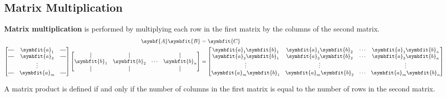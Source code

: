 \documentclass{article}
\begin{document}
\subsection{Matrix Multiplication}
\begin{definition}
    \textbf{Matrix multiplication} is performed by multiplying each row
    in the first matrix by the columns of the second matrix.
    \begin{align*}
        \symbf{A} \symbfit{B} & = \symbfit{C} \\
        \begin{bmatrix}
            \horzbar & \symbfit{a}_{1} & \horzbar \\
            \horzbar & \symbfit{a}_{2} & \horzbar \\
                     & \vdots          &          \\
            \horzbar & \symbfit{a}_{m} & \horzbar
        \end{bmatrix}
        \begin{bmatrix}
            \vertbar        & \vertbar        &        & \vertbar        \\
            \symbfit{b}_{1} & \symbfit{b}_{2} & \cdots & \symbfit{b}_{n} \\
            \vertbar        & \vertbar        &        & \vertbar
        \end{bmatrix}
                                & =
        \begin{bmatrix}
            \symbfit{a}_1\symbfit{b}_1 & \symbfit{a}_1\symbfit{b}_2 & \cdots & \symbfit{a}_1\symbfit{b}_n \\
            \symbfit{a}_2\symbfit{b}_1 & \symbfit{a}_2\symbfit{b}_2 & \cdots & \symbfit{a}_2\symbfit{b}_n \\
            \vdots                     & \vdots                     &        & \vdots                     \\
            \symbfit{a}_m\symbfit{b}_1 & \symbfit{a}_m\symbfit{b}_2 & \cdots & \symbfit{a}_m\symbfit{b}_n
        \end{bmatrix}
    \end{align*}
\end{definition}
\begin{theorem}
    A matrix product is defined if and only if the number of columns in
    the first matrix is equal to the number of rows in the second
    matrix.
\end{theorem}
\end{document}
